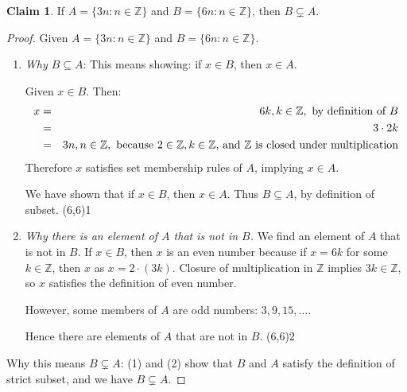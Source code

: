\documentclass[11pt]{article}
\newcommand\tn{\textnormal}
\newcommand{\Z}{\mathbb{Z}}
\renewcommand\subset\subseteq
\newcommand\st{:}
\theoremstyle{definition}
\newtheorem*{claim*}{Claim}
\newcommand\qedpart[1]{ \hfill \framebox(6,6){\tiny #1}}
\begin{document}
\begin{mdframed}
\begin{claim*}
If $A=\{ 3n \st n \in \Z\}$ and $B=\{ 6n \st n\in \Z\}$, then $B\subsetneq A$.
\end{claim*}
\begin{proof}
Given $A=\{ 3n \st n \in \Z\}$ and $B=\{ 6n \st n\in \Z\}$. 

\begin{enumerate}
\item {\it Why $B\subset A$}: This means showing: if $x\in B$, then $x\in A$.

Given $x\in B$. Then:
	\begin{eqnarray*}
	x &=&6k, k\in \Z, \tn{ by definition of $B$} \\ 
	   &=& 3\cdot 2k \\ 
	   &=& 3n, n\in \Z, \tn{ because $2\in \Z, k\in \Z$, and $\Z$ is closed under multiplication}
	\end{eqnarray*}
Therefore $x$ satisfies set membership rules of $A$, implying $x\in A$. 

We have shown that if $x\in B$, then $x\in A$. Thus $B\subset A$, by definition of subset. \qedpart{1}

\item {\it Why there is an element of $A$ that is not in $B$.} We find an element of $A$ that is not in $B$.
If $x\in B$, then $x$ is an even number because if $x=6k$ for some $k\in\Z$, then $x$ as $x=2\cdot (3k)$. Closure of multiplication in $\Z$ implies $3k\in \Z$, so $x$ satisfies the definition of even number. 

However, some members of $A$ are odd numbers: $3, 9, 15, \dots $. 

Hence there are elements of $A$ that are not in $B$. \qedpart{2}

\end{enumerate}
Why this means $B\subsetneq A$: (1) and (2) show that $B$ and $A$ satisfy the definition of strict subset, and we have $B\subsetneq A$.
\end{proof}
\end{mdframed}
\end{document}
